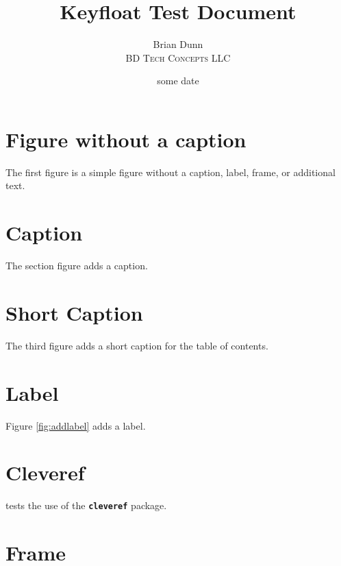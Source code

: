 \documentclass{article}
\title{Keyfloat Test Document}
\author{Brian Dunn\\ \textsc{\footnotesize{BD Tech Concepts LLC}}}
\date{some date}
\newcommand*{\sectionauthor}[3]{\section{#1}}
\newcommand{\pkg}[1]{\textbf{\texttt{#1}}}
\begin{document}
\maketitle

\tableofcontents
\listoffigures
\listoftables
\listofdiagrams

\clearpage

\color{blue}

\sectionauthor{Figure without a caption}{First}{Last}

The first figure is a simple figure without a caption, label, frame, or additional text.


\section{Caption}


The section figure adds a caption.


\section{Short Caption}


The third figure adds a short caption for the table of contents.


\section{Label}


Figure \ref{fig:addlabel} adds a label.


\section{Cleveref}


 tests the use of the \pkg{cleveref} package.


\section{Frame}

\end{document}
